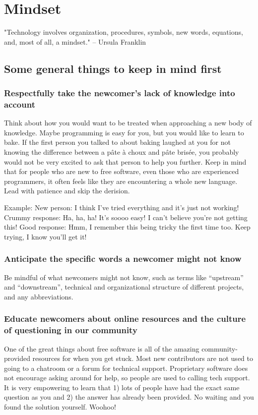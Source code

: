 \chapter{Mindset}

"Technology involves organization, procedures, symbols, new words, equations, and, most of all, a mindset." -- Ursula Franklin 

\section{Some general things to keep in mind first}

\subsection{Respectfully take the newcomer’s lack of knowledge into account}
Think about how you would want to be treated when approaching a new body of knowledge. Maybe programming is easy for you, but you would like to learn to bake. If the first person you talked to about baking laughed at you for not knowing the difference between a pâte à choux and pâte brisée, you probably would not be very excited to ask that person to help you further. Keep in mind that for people who are new to free software, even those who are experienced programmers, it often feels like they are encountering a whole new language. Lead with patience and skip the derision.

Example:
New person: I think I’ve tried everything and it’s just not working!
Crummy response: Ha, ha, ha! It’s soooo easy! I can’t believe you’re not getting this!
Good response: Hmm, I remember this being tricky the first time too. Keep trying, I know you’ll get it! 

\subsection{Anticipate the specific words a newcomer might not know}
Be mindful of what newcomers might not know, such as terms like “upstream” and “downstream”, technical and organizational structure of different projects, and any abbreviations.

\subsection{Educate newcomers about online resources and the culture of questioning in our community}
One of the great things about free software is all of the amazing community-provided resources for when you get stuck. Most new contributors are not used to going to a chatroom or a forum for technical support. Proprietary software does not encourage asking around for help, so people are used to calling tech support. It is very empowering to learn that 1) lots of people have had the exact same question as you and 2) the answer has already been provided. No waiting and you found the solution yourself. Woohoo!

